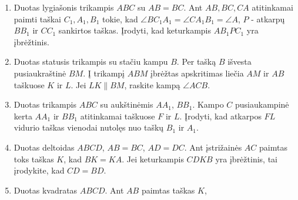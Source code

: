 \begin{enumerate}
\item Duotas lygiašonis trikampis $ABC$ su $AB = BC$. Ant
  $AB, BC, CA$ atitinkamai paimti taškai $C_1, A_1, B_1$
  tokie, kad $\angle BC_1A_1 = \angle CA_1B_1 = \angle A$,
  $P$ - atkarpų $BB_1$ ir $CC_1$ sankirtos taškas. Įrodyti,
  kad keturkampis $AB_1PC_1$ yra įbrėžtinis.
\item Duotas statusis trikampis su stačiu kampu $B$. Per
  tašką $B$ išvesta pusiaukraštinė $BM$. Į trikampį $ABM$
  įbrėžtas apskritimas liečia $AM$ ir $AB$ taškuose $K$ ir
  $L$. Jei $LK\parallel{BM}$, raskite kampą $\angle ACB$.
\item Duotas trikampis $ABC$ su aukštinėmis $AA_1$, $BB_1$.
  Kampo $C$ pusiaukampinė kerta $AA_1$ ir $BB_1$ atitinkamai
  taškuose $F$ ir $L$. Įrodyti, kad atkarpos $FL$ vidurio
  taškas vienodai nutolęs nuo taškų $B_1$ ir $A_1$.
\item Duotas deltoidas $ABCD$, $AB=BC$, $AD=DC$. Ant
  įstrižainės $AC$ paimtas toks taškas $K$, kad $BK = KA$.
  Jei keturkampis $CDKB$ yra  įbrėžtinis, tai įrodykite, kad
  $CD = BD$.
\item Duotas kvadratas $ABCD$. Ant $AB$ paimtas taškas $K$,

\end{enumerate}

